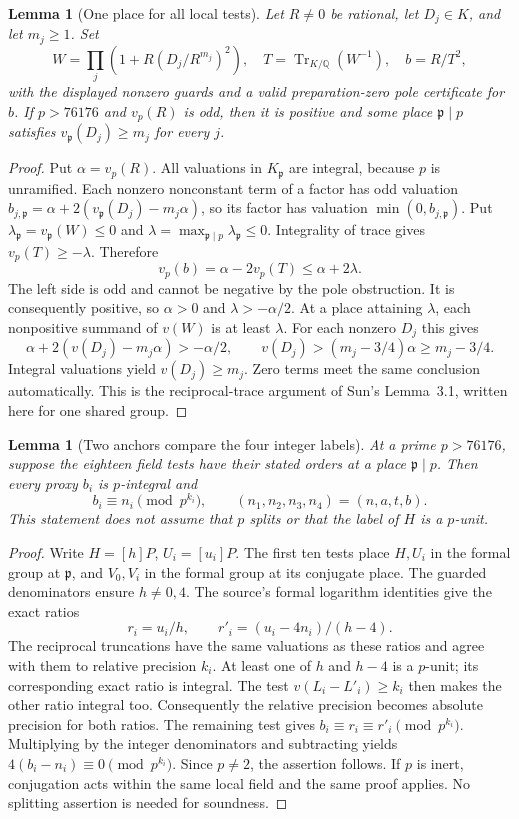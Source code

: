 \documentclass[11pt]{article}
\newtheorem{lemma}[theorem]{Lemma}
\theoremstyle{definition}
\begin{document}
\begin{lemma}[One place for all local tests]
Let $R\ne0$ be rational, let $D_j\in K$, and let $m_j\ge1$.
Set
\[
 W=\prod_j(1+R(D_j/R^{m_j})^2),\quad
 T=\operatorname{Tr}_{K/\mathbb Q}(W^{-1}),\quad b=R/T^2,
\]
with the displayed nonzero guards and a valid preparation-zero pole
certificate for $b$. If $p>76176$ and $v_p(R)$ is odd, then it is
positive and some place $\mathfrak p\mid p$ satisfies
$v_{\mathfrak p}(D_j)\ge m_j$ for every $j$.
\end{lemma}
\begin{proof}
Put $\alpha=v_p(R)$. All valuations in $K_{\mathfrak p}$ are integral,
because $p$ is unramified. Each nonzero nonconstant term of a factor
has odd valuation
$b_{j,\mathfrak p}=\alpha+2(v_{\mathfrak p}(D_j)-m_j\alpha)$,
so its factor has valuation $\min(0,b_{j,\mathfrak p})$. Put
$\lambda_{\mathfrak p}=v_{\mathfrak p}(W)\le0$ and
$\lambda=\max_{\mathfrak p\mid p}\lambda_{\mathfrak p}\le0$.
Integrality of trace gives $v_p(T)\ge-\lambda$. Therefore
\[
 v_p(b)=\alpha-2v_p(T)\le\alpha+2\lambda.
\]
The left side is odd and cannot be negative by the pole obstruction.
It is consequently positive, so $\alpha>0$ and
$\lambda>-\alpha/2$. At a place attaining $\lambda$, each nonpositive
summand of $v(W)$ is at least $\lambda$. For each nonzero $D_j$ this gives
\[
 \alpha+2(v(D_j)-m_j\alpha)>-\alpha/2,
 \qquad v(D_j)>(m_j-3/4)\alpha\ge m_j-3/4.
\]
Integral valuations yield $v(D_j)\ge m_j$. Zero terms meet the same
conclusion automatically. This is the reciprocal-trace argument of
Sun's Lemma~3.1, written here for one shared group.
\end{proof}

\begin{lemma}[Two anchors compare the four integer labels]
At a prime $p>76176$, suppose the eighteen field tests have their stated
orders at a place $\mathfrak p\mid p$. Then every proxy $b_i$ is
$p$-integral and
\[
 b_i\equiv n_i\pmod{p^{k_i}},\qquad
 (n_1,n_2,n_3,n_4)=(n,a,t,b).
\]
This statement does not assume that $p$ splits or that the label of
$H$ is a $p$-unit.
\end{lemma}
\begin{proof}
Write $H=[h]P$, $U_i=[u_i]P$. The first ten tests place $H,U_i$ in
the formal group at $\mathfrak p$, and $V_0,V_i$ in the formal group
at its conjugate place. The guarded denominators ensure $h\ne0,4$.
The source's formal logarithm identities give the exact ratios
\[
 r_i=u_i/h,\qquad r'_i=(u_i-4n_i)/(h-4).
\]
The reciprocal truncations have the same valuations as these ratios
and agree with them to relative precision $k_i$. At least one of $h$
and $h-4$ is a $p$-unit; its corresponding exact ratio is integral.
The test $v(L_i-L'_i)\ge k_i$ then makes the other ratio integral too.
Consequently the relative precision becomes absolute precision for
both ratios. The remaining test gives
$b_i\equiv r_i\equiv r'_i\pmod{p^{k_i}}$. Multiplying by the integer
denominators and subtracting yields
$4(b_i-n_i)\equiv0\pmod{p^{k_i}}$. Since $p\ne2$, the assertion follows.
If $p$ is inert, conjugation acts within the same local field and the
same proof applies. No splitting assertion is needed for soundness.
\end{proof}
\end{document}
